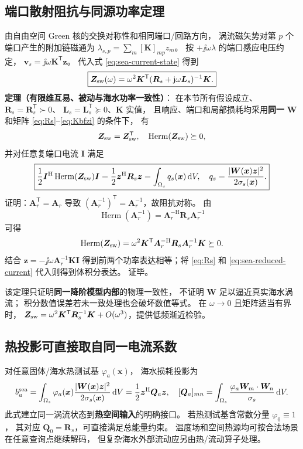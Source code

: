 \subsection{端口散射阻抗与同源功率定理}
由自由空间 Green 核的交换对称性和相同端口/回路方向，
涡流磁矢势对第 \(p\) 个端口产生的附加链磁通为
\(\lambda_{s,p}=\sum_m[\bm K]_{mp} z_m\)。
按 \(+\jj\omega\lambda\) 的端口感应电压约定，
\(\bm v_s=\jj\omega\bm K^{\mathsf T}\bm z\)。
代入式 \eqref{eq:sea-current-state} 得到
\begin{equation}
\boxed{
\bm Z_{\rm sw}(\omega)
=\omega^2\bm K^{\mathsf T}
(\bm R_s+\mathrm j\omega\bm L_s)^{-1}\bm K .}
\label{eq:zsw-schur}
\end{equation}
\textbf{定理（有限维互易、被动与海水功率一致性）}：
在本节所有假设成立、\(\bm R_s=\bm R_s^{\mathsf T}\succ0\)、
\(\bm L_s=\bm L_s^{\mathsf T}\succeq0\)、\(\bm K\) 实值，
且响应、端口和局部损耗均采用\textbf{同一} \(\bm W\)
和矩阵 \eqref{eq:Rs}--\eqref{eq:Kbfzi} 的条件下，
有
\begin{equation}
\bm Z_{\rm sw}=\bm Z_{\rm sw}^{\mathsf T},\quad
\operatorname{Herm}(\bm Z_{\rm sw})\succeq0,
\label{eq:sea-passivity-theorem}
\end{equation}
并对任意复端口电流 \(\bm I\) 满足
\begin{equation}
\boxed{
\frac12\bm I^{\mathrm H}\operatorname{Herm}(\bm Z_{\rm sw})\bm I
=\frac12\bm z^{\mathrm H}\bm R_s\bm z
=\int_{\Omega_s}q_s(\bm x)\,\mathrm dV,
\quad
q_s=\frac{|\bm W(\bm x)\bm z|^2}{2\sigma_s(\bm x)}.
}
\label{eq:sea-power-proof}
\end{equation}
证明：\(\bm A_r^{\mathsf T}=\bm A_r\) 导致
\((\bm A_r^{-1})^{\mathsf T}=\bm A_r^{-1}\)，故阻抗对称。
由
\[
\operatorname{Herm}(\bm A_r^{-1})
=\bm A_r^{-\mathrm H}\bm R_s\bm A_r^{-1}
\]
可得
\[
\operatorname{Herm}(\bm Z_{\rm sw})
=\omega^2\bm K^{\mathsf T}
\bm A_r^{-\mathrm H}\bm R_s\bm A_r^{-1}\bm K\succeq0.
\]
结合 \(\bm z=-\jj\omega\bm A_r^{-1}\bm K\bm I\)
得到前两个功率表达相等；将 \eqref{eq:Rs}
和 \eqref{eq:sea-reduced-current} 代入则得到体积分表达。
证毕。

该定理只证明\textbf{同一降阶模型内部}的物理一致性，
不证明 \(\bm W\) 足以逼近真实海水涡流；
积分数值误差若未一致处理也会破坏数值等式。
在 \(\omega\to0\) 且矩阵适当有界时，
\(\bm Z_{\rm sw}=\omega^2\bm K^{\mathsf T}\bm R_s^{-1}\bm K
+O(\omega^3)\)，提供低频渐近检验。

\subsection{热投影可直接取自同一电流系数}
对任意固体/海水热测试基 \(\varphi_a(\bm x)\)，
海水损耗投影为
\[
b_a^{\rm sea}
=\int_{\Omega_s}\varphi_a(\bm x)
\frac{|\bm W(\bm x)\bm z|^2}{2\sigma_s(\bm x)}\,\mathrm dV
=\frac12\bm z^{\mathrm H}\bm Q_a\bm z ,
\quad
[\bm Q_a]_{mn}=
\int_{\Omega_s}\frac{\varphi_a\bm W_m\cdot\bm W_n}{\sigma_s}\,\mathrm dV.
\]
此式建立同一涡流状态到\textbf{热空间输入}的明确接口。
若热测试基含常数分量 \(\varphi_0\equiv1\)，
其对应 \(\bm Q_0=\bm R_s\)，可直接满足总能量约束。
温度场和空间热源均可按合法场景在任意查询点继续解码，
但复杂海水外部流动应另由热/流动算子处理。
